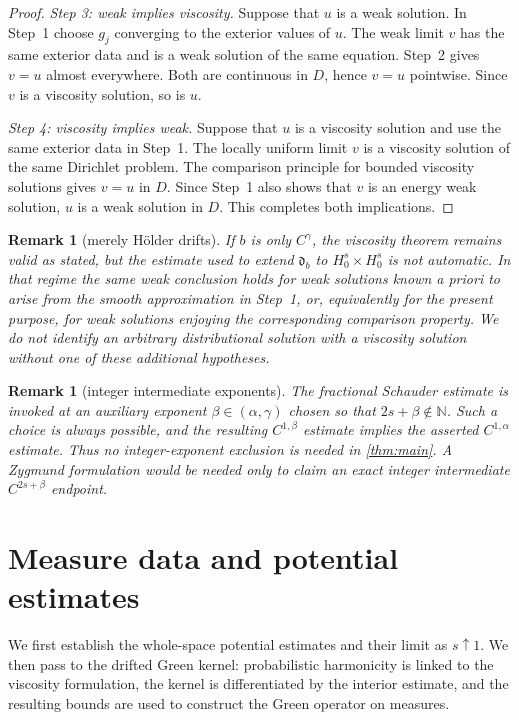 \documentclass[10pt,a4paper]{amsart}
\numberwithin{equation}{section}
\newtheorem{remark}[theorem]{Remark}
\newcommand{\rev}[1]{#1}
\begin{document}
\begin{proof}
\smallskip
\noindent\emph{Step 3: weak implies viscosity.}
Suppose that $u$ is a weak solution.  In Step~1 choose $g_j$ converging to
the exterior values of $u$.  The weak limit $v$ has the same exterior data
and is a weak solution of the same equation.  Step~2 gives $v=u$ almost
everywhere.  Both are continuous in $D$, hence $v=u$ pointwise.  Since $v$
is a viscosity solution, so is $u$.

\smallskip
\noindent\emph{Step 4: viscosity implies weak.}
Suppose that $u$ is a viscosity solution and use the same exterior data in
Step~1.  The locally uniform limit $v$ is a viscosity solution of the same
Dirichlet problem.  The comparison principle for bounded viscosity
solutions gives $v=u$ in $D$.  Since Step~1 also shows that $v$ is an energy
weak solution, $u$ is a weak solution in $D$.  This completes both
implications.
\end{proof}

\begin{remark}[merely H\"older drifts]\label{rem:holder-equivalence}
If $b$ is only $C^\gamma$, the viscosity theorem remains valid as
stated, but the estimate used to extend $\mathfrak d_b$ to
$H_0^s\times H_0^s$ is not automatic.  In that regime the same weak
conclusion holds for weak solutions known a priori to arise from the smooth
approximation in Step~1, or, equivalently for the present purpose, for weak
solutions enjoying the corresponding comparison property.  We do not
identify an arbitrary distributional solution with a viscosity solution
without one of these additional hypotheses.
\end{remark}

\begin{remark}[integer intermediate exponents]
The fractional Schauder estimate is invoked at an auxiliary exponent
$\beta\in(\alpha,\gamma)$ chosen so that
$2s+\beta\notin\mathbb N$.  Such a choice is always possible,
and the resulting $C^{1,\beta}$ estimate implies the asserted
$C^{1,\alpha}$ estimate.  Thus no integer-exponent exclusion is needed in
\cref{thm:main}.  A Zygmund formulation would be needed only to claim an
exact integer intermediate $C^{2s+\beta}$ endpoint.
\end{remark}

\section{Measure data and potential estimates}\label{sec:measure}

\rev{We first establish the whole-space potential estimates and their limit
as $s\uparrow1$.  We then pass to the drifted Green kernel: probabilistic
harmonicity is linked to the viscosity formulation, the kernel is
differentiated by the interior estimate, and the resulting bounds are used
to construct the Green operator on measures.}
\end{document}
